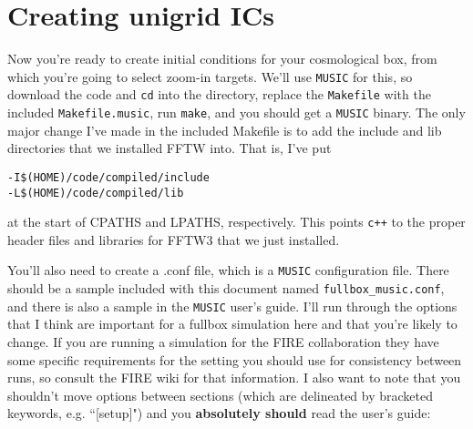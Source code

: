 \documentclass[10pt,a4paper,onecolumn]{article}
\begin{document}
\section{Creating unigrid ICs}
Now you're ready to create initial conditions for your cosmological box, 
from which you're going to select zoom-in targets.  We'll use \texttt{MUSIC} for this, 
so download the code and  \texttt{cd} into the directory, replace the \texttt{Makefile} 
with the included \texttt{Makefile.music}, run \texttt{make}, and
you should get a \texttt{MUSIC} binary.  The only major change I've made 
in the included Makefile is to add the include and lib directories that we 
installed FFTW into.  That is, I've put
\begin{verbatim}
-I$(HOME)/code/compiled/include
-L$(HOME)/code/compiled/lib
\end{verbatim}
at the start of CPATHS and LPATHS, respectively.  This points \texttt{c++} 
to the proper header files and libraries for FFTW3 that we just installed.  

You'll also need to create a .conf file, which is a \texttt{MUSIC} configuration file.  There
should be a sample included with this document named \texttt{fullbox\_music.conf}, and
there is also a sample in the \texttt{MUSIC} user's guide.  I'll run through the options that 
I  think are important for a fullbox simulation here and that you're likely to change. If you are running a simulation for the FIRE collaboration they have some specific requirements for the setting you should use for consistency between runs, so consult the FIRE wiki for that information. I also want to note that you shouldn't move options between sections (which are delineated by bracketed keywords, e.g. ``[setup]") and you \textbf{absolutely should} read the user's guide:
\end{document}
